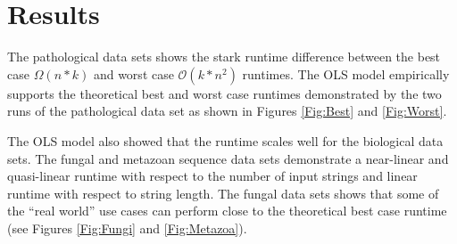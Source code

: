 \documentclass{bmcart}
\begin{document}
\section*{Results}

The pathological data sets shows the stark runtime difference between the best case $\Omega(n * k)$ and worst case $\mathcal{O}(k * n^2)$ runtimes.
The OLS model empirically supports the theoretical best and worst case runtimes demonstrated by the two runs of the pathological data set as shown in Figures \ref{Fig:Best} and \ref{Fig:Worst}.

The OLS model also showed that the runtime scales well for the biological data sets.
The fungal and metazoan sequence data sets demonstrate a near-linear and quasi-linear runtime with respect to the number of input strings and linear runtime with respect to string length.
The fungal data sets shows that some of the ``real world'' use cases can perform close to the theoretical best case runtime (see Figures \ref{Fig:Fungi} and \ref{Fig:Metazoa}).


\end{document}
